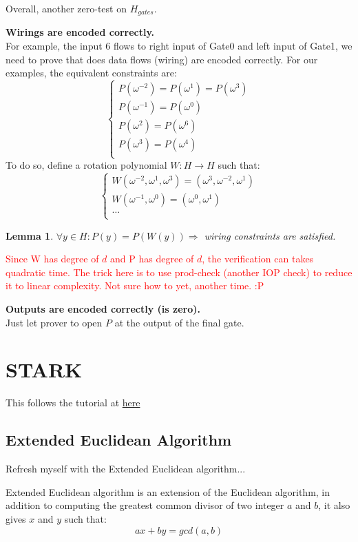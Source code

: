 \documentclass[10pt]{article}
\newtheorem{lemma}{Lemma}
\newcommand{\HL}[1]{\textcolor{red}{#1}}
\begin{document}
Overall, another zero-test on $H_{gates}$.

\textbf{Wirings are encoded correctly.}\\
For example, the input $6$ flows to right input of Gate0 and left input of
Gate1, we need to prove that does data flows (wiring) are encoded correctly.
For our examples, the equivalent constraints are:
$$
  \begin{cases}
    P(\omega^{-2}) = P(\omega^1) = P(\omega^3) \\
    P(\omega^{-1}) = P(\omega^0) \\
    P(\omega^{2}) = P(\omega^6) \\
    P(\omega^{3}) = P(\omega^4) \\
  \end{cases}       
$$
To do so, define a rotation polynomial $W : H \rightarrow H$ such that:
$$
  \begin{cases}
      W(\omega^{-2}, \omega^{1}, \omega^{3}) = (\omega^{3}, \omega^{-2}, \omega^{1})\\
      W(\omega^{-1}, \omega^{0}) = (\omega^{0}, \omega^{1}) \\
      \ldots \\
  \end{cases}       
$$
\begin{lemma}
    $\forall y \in H: P(y) = P(W(y)) \Rightarrow $ wiring constraints are
    satisfied.
\end{lemma}
\HL{Since W has degree of $d$ and P has degree of $d$, the verification can takes
quadratic time. The trick here is to use prod-check (another IOP check) to
reduce it to linear complexity. Not sure how to yet, another time. :P}

\textbf{Outputs are encoded correctly (is zero).}\\
Just let prover to open $P$ at the output of the final gate.

\section{STARK}
This follows the tutorial at
\href{https://aszepieniec.github.io/stark-anatomy}{here}


\subsection{Extended Euclidean Algorithm}
Refresh myself with the Extended Euclidean algorithm...

Extended Euclidean algorithm is an extension of the Euclidean algorithm, in
addition to computing the greatest common divisor of two integer $a$ and $b$,
it also gives $x$ and $y$ such that:
$$
ax + by = gcd(a, b)
$$
\end{document}
